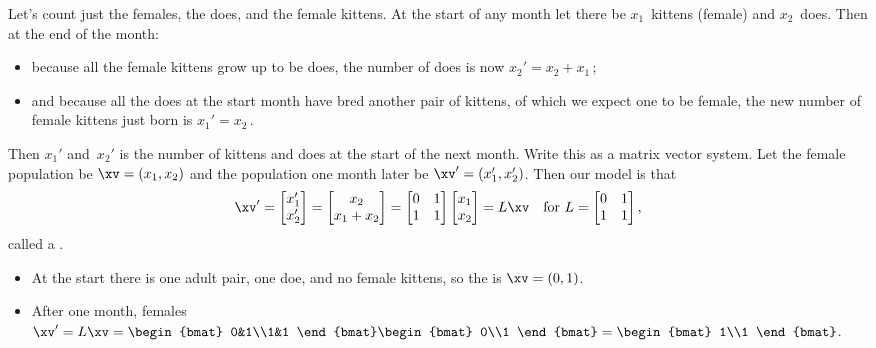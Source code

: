 \begin{reduce}
\begin{example}
Let's count just the females, the does, and the female kittens.
At the start of any month let there be \(x_1\)~kittens (female) and \(x_2\)~does.
Then at the end of the month:
\begin{itemize}
\item because all the female kittens grow up to be does, the number of does is now \(x_2'=x_2+x_1\)\,;
\item and because all the does at the start month have bred another pair of kittens, of which we expect one to be female, the new number of female kittens just born is \(x_1'=x_2\)\,.
\end{itemize}
Then \(x_1'\) and~\(x_2'\) is the number of kittens and does at the start of the next month.
Write this as a matrix vector system.
Let the female population be \(\xv=(x_1,x_2)\) and the population one month later be \(\xv'=(x_1',x_2')\).
Then our model is that
\begin{equation*}
\xv'=\begin{bmatrix} x_1'\\x_2' \end{bmatrix}
=\begin{bmatrix} x_2\\x_1+x_2 \end{bmatrix}
=\begin{bmatrix} 0&1\\1&1 \end{bmatrix}\begin{bmatrix} x_1\\x_2 \end{bmatrix}
=L\xv
\quad\text{for }L=\begin{bmatrix} 0&1\\1&1 \end{bmatrix},
\end{equation*}
called a .
\begin{itemize}
\item At the start there is one adult pair, one doe, and no female kittens, so the  is \(\xv=(0,1)\).
\item After one month,  females \(\xv'=L\xv=\begin{bmat} 0&1\\1&1 \end{bmat}\begin{bmat} 0\\1 \end{bmat}=\begin{bmat} 1\\1 \end{bmat}\).

\end{itemize}
\end{example}
\end{reduce}
